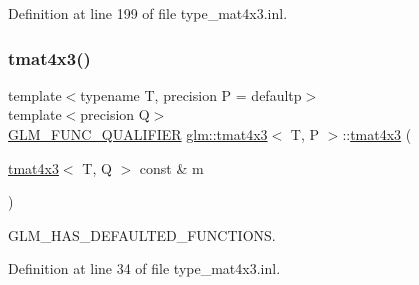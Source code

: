 Definition at line 199 of file type\+\_\+mat4x3.\+inl.

\mbox{\label{structglm_1_1tmat4x3_a1624d09850df202d4eb177a4ae7819c5}} 
\subsubsection{\texorpdfstring{tmat4x3()}{tmat4x3()}\hspace{0.1cm}{\footnotesize\ttfamily [19/22]}}
{\footnotesize\ttfamily template$<$typename T, precision P = defaultp$>$ \\
template$<$precision Q$>$ \\
\mbox{\hyperlink{setup_8hpp_a33fdea6f91c5f834105f7415e2a64407}{G\+L\+M\+\_\+\+F\+U\+N\+C\+\_\+\+Q\+U\+A\+L\+I\+F\+I\+ER}} \mbox{\hyperlink{structglm_1_1tmat4x3}{glm\+::tmat4x3}}$<$ T, P $>$\+::\mbox{\hyperlink{structglm_1_1tmat4x3}{tmat4x3}} (\begin{DoxyParamCaption}\item[{\mbox{\hyperlink{structglm_1_1tmat4x3}{tmat4x3}}$<$ T, Q $>$ const \&}]{m }\end{DoxyParamCaption})}



G\+L\+M\+\_\+\+H\+A\+S\+\_\+\+D\+E\+F\+A\+U\+L\+T\+E\+D\+\_\+\+F\+U\+N\+C\+T\+I\+O\+NS. 



Definition at line 34 of file type\+\_\+mat4x3.\+inl.

\mbox{\label{structglm_1_1tmat4x3_a345c6365fa065203321bbda257bca54a}} 
